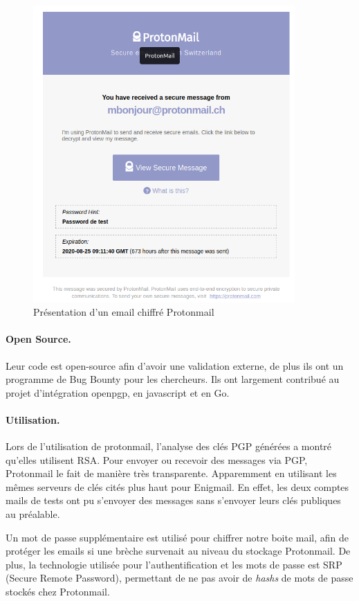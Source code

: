 \begin{figure}[h!]
	\includegraphics[width=10cm]{images/protonmailPresentation.png}
	\centering
	\caption{Présentation d'un email chiffré Protonmail}
	\label{fig:ProtonmailPres}
\end{figure}

\paragraph*{Open Source.}
Leur code est open-source afin d'avoir une validation externe, de plus ils ont un programme de Bug Bounty pour les chercheurs. Ils ont largement contribué au projet d'intégration openpgp, en javascript et en Go.

\paragraph*{Utilisation.}
Lors de l'utilisation de protonmail, l'analyse des clés PGP générées a montré qu'elles utilisent RSA. Pour envoyer ou recevoir des messages via PGP, Protonmail le fait de manière très transparente. Apparemment en utilisant les mêmes serveurs de clés cités plus haut pour Enigmail. En effet, les deux comptes mails de tests ont pu s'envoyer des messages sans s'envoyer leurs clés publiques au préalable.

Un mot de passe supplémentaire est utilisé pour chiffrer notre boite mail, afin de protéger les emails si une brèche survenait au niveau du stockage Protonmail. De plus, la technologie utilisée pour l'authentification et les mots de passe est SRP (Secure Remote Password), permettant de ne pas avoir de \textit{hashs} de mots de passe stockés chez Protonmail.


